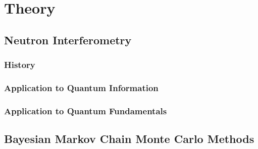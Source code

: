 
\chapter{Theory} %
\label{Chapter1}


\section{Neutron Interferometry}
\subsection{History}
\subsection{Application to Quantum Information}
\subsection{Application to Quantum Fundamentals}
\section{Bayesian Markov Chain Monte Carlo Methods}

